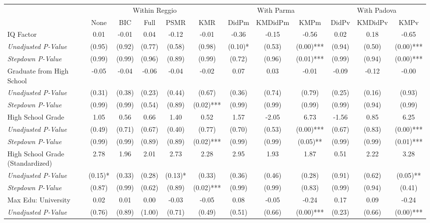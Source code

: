 \begin{tabular}{l c c c c c c c c c c c}
\toprule
& \multicolumn{5}{c}{Within Reggio} & \multicolumn{3}{c}{With Parma} & \multicolumn{3}{c}{With Padova} \\\cmidrule(lr){2-6} \cmidrule(lr){7-9} \cmidrule(lr){10-12}
 & None & BIC & Full & PSMR & KMR & DidPm & KMDidPm & KMPm & DidPv & KMDidPv & KMPv \\
\midrule
IQ Factor & 0.01 & -0.01 & 0.04 & -0.12 & -0.01 & -0.36 & -0.15 & -0.56 & 0.02 & 0.18 & -0.65 \\
\quad \textit{Unadjusted P-Value} & (0.95) & (0.92) & (0.77) & (0.58) & (0.98) & (0.10)* & (0.53) & (0.00)*** & (0.94) & (0.50) & (0.00)*** \\
\quad \textit{Stepdown P-Value} & (0.99) & (0.99) & (0.96) & (0.89) & (0.99) & (0.72) & (0.96) & (0.01)*** & (0.99) & (0.94) & (0.00)*** \\
Graduate from High School & -0.05 & -0.04 & -0.06 & -0.04 & -0.02 & 0.07 & 0.03 & -0.01 & -0.09 & -0.12 & -0.00 \\
\quad \textit{Unadjusted P-Value} & (0.31) & (0.38) & (0.23) & (0.44) & (0.67) & (0.36) & (0.74) & (0.79) & (0.25) & (0.16) & (0.93) \\
\quad \textit{Stepdown P-Value} & (0.99) & (0.99) & (0.54) & (0.89) & (0.02)*** & (0.99) & (0.99) & (0.99) & (0.99) & (0.94) & (0.99) \\
High School Grade & 1.05 & 0.56 & 0.66 & 1.40 & 0.52 & 1.57 & -2.05 & 6.73 & -1.56 & 0.85 & 6.25 \\
\quad \textit{Unadjusted P-Value} & (0.49) & (0.71) & (0.67) & (0.40) & (0.77) & (0.70) & (0.53) & (0.00)*** & (0.67) & (0.83) & (0.00)*** \\
\quad \textit{Stepdown P-Value} & (0.99) & (0.99) & (0.89) & (0.89) & (0.02)*** & (0.99) & (0.99) & (0.05)** & (0.99) & (0.99) & (0.01)*** \\
High School Grade (Standardized) & 2.78 & 1.96 & 2.01 & 2.73 & 2.28 & 2.95 & 1.93 & 1.87 & 0.51 & 2.22 & 3.28 \\
\quad \textit{Unadjusted P-Value} & (0.15)* & (0.33) & (0.28) & (0.13)* & (0.33) & (0.36) & (0.46) & (0.28) & (0.91) & (0.62) & (0.05)** \\
\quad \textit{Stepdown P-Value} & (0.87) & (0.99) & (0.62) & (0.89) & (0.02)*** & (0.99) & (0.99) & (0.83) & (0.99) & (0.94) & (0.41) \\
Max Edu: University & 0.02 & 0.01 & 0.00 & -0.03 & -0.05 & 0.08 & -0.05 & -0.24 & 0.17 & 0.09 & -0.24 \\
\quad \textit{Unadjusted P-Value} & (0.76) & (0.89) & (1.00) & (0.71) & (0.49) & (0.51) & (0.66) & (0.00)*** & (0.23) & (0.66) & (0.00)*** \\

\end{tabular}
